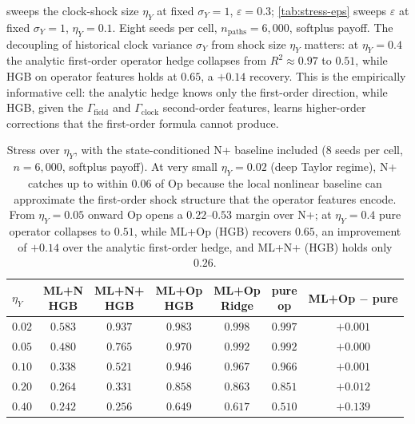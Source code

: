 \documentclass[11pt,reqno]{amsart}
\theoremstyle{plain}
\theoremstyle{definition}
\theoremstyle{remark}
\begin{document}
 sweeps the clock-shock size $\eta_{Y}$
at fixed $\sigma_{Y}=1$, $\varepsilon=0.3$;
\cref{tab:stress-eps} sweeps $\varepsilon$ at fixed
$\sigma_{Y}=1$, $\eta_{Y}=0.1$. Eight seeds per cell,
$n_{\mathrm{paths}}=6{,}000$, softplus payoff. The decoupling
of historical clock variance $\sigma_{Y}$ from shock size
$\eta_{Y}$ matters: at $\eta_{Y}=0.4$ the analytic first-order
operator hedge collapses from $R^{2}\approx 0.97$ to $0.51$,
while HGB on operator features holds at $0.65$, a $+0.14$
recovery. This is the empirically informative cell: the
analytic hedge knows only the first-order direction, while
HGB, given the $\Gamma_{\mathrm{field}}$ and
$\Gamma_{\mathrm{clock}}$ second-order features, learns
higher-order corrections that the first-order formula cannot
produce.

\begin{table}[ht]
\centering
\small
\setlength{\tabcolsep}{4pt}
\begin{tabular}{lcccccc}
\toprule
$\eta_{Y}$
 & \makecell{ML+N\\HGB}
 & \makecell{ML+N+\\HGB}
 & \makecell{ML+Op\\HGB}
 & \makecell{ML+Op\\Ridge}
 & \makecell{pure\\op}
 & \makecell{ML+Op\\$-$ pure} \\
\midrule
$0.02$ & $0.583$ & $0.937$ & $0.983$ & $0.998$ & $0.997$ & $+0.001$ \\
$0.05$ & $0.480$ & $0.765$ & $0.970$ & $0.992$ & $0.992$ & $+0.000$ \\
$0.10$ & $0.338$ & $0.521$ & $0.946$ & $0.967$ & $0.966$ & $+0.001$ \\
$0.20$ & $0.264$ & $0.331$ & $0.858$ & $0.863$ & $0.851$ & $+0.012$ \\
$0.40$ & $0.242$ & $0.256$ & $\mathbf{0.649}$ & $0.617$ & $0.510$ & $\mathbf{+0.139}$ \\
\bottomrule
\end{tabular}
\caption{Stress over $\eta_{Y}$, with the state-conditioned N+
baseline included (8 seeds per cell, $n=6{,}000$, softplus
payoff). At very small $\eta_{Y}=0.02$ (deep Taylor regime), N+
catches up to within $0.06$ of Op because the local nonlinear
baseline can approximate the first-order shock structure that
the operator features encode. From $\eta_{Y}=0.05$ onward Op
opens a $0.22$--$0.53$ margin over N+; at $\eta_{Y}=0.4$ pure
operator collapses to $0.51$, while ML+Op (HGB) recovers $0.65$,
an improvement of $+0.14$ over the analytic first-order hedge,
and ML+N+ (HGB) holds only $0.26$.}
\label{tab:stress-etaY}
\end{table}
\end{document}
